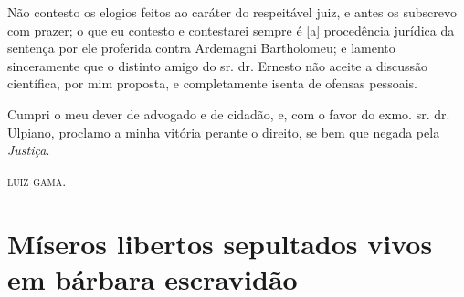 {Não contesto os elogios feitos ao caráter do respeitável juiz, e antes
os subscrevo com prazer; o que eu contesto e contestarei sempre é
{[}a{]} procedência jurídica da sentença por ele proferida contra
Ardemagni Bartholomeu; e lamento sinceramente que o distinto amigo do
sr. dr. Ernesto não aceite a discussão científica, por mim proposta, e
completamente isenta de ofensas pessoais.

Cumpri o meu dever de advogado e de cidadão, e, com o favor do exmo. sr.
dr. Ulpiano, proclamo a minha vitória perante o direito, se bem que
negada pela \emph{Justiça}.

\textsc{luiz gama}.

\part{Míseros libertos sepultados vivos em bárbara escravidão}

}
